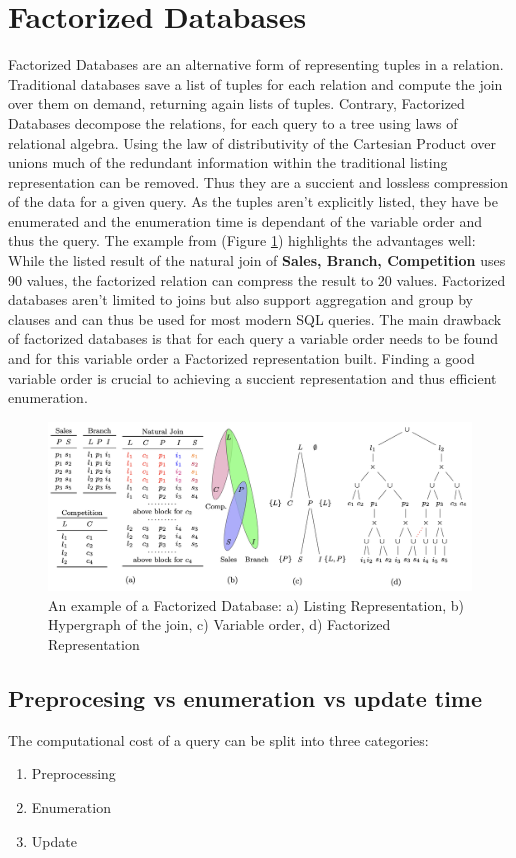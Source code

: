 \documentclass[abstracton,12pt]{scrreprt}
\begin{document}
\section{Factorized Databases}
Factorized Databases are an alternative form of representing tuples in a relation. Traditional databases save a list of tuples for each relation and compute the join over them on demand, returning again lists of tuples. Contrary, Factorized Databases decompose the relations, for each query to a tree using laws of relational algebra. Using the law of distributivity of the Cartesian Product over unions much of the redundant information within the traditional listing representation can be removed. Thus they are a succient and lossless compression of the data for a given query. As the tuples aren't explicitly listed, they have be enumerated and the enumeration time is dependant of the variable order and thus the query. 
The example from \cite{FactorizedDB} (Figure \ref{fig:factorizedDBExample}) highlights the advantages well: While the listed result of the natural join of \textbf{Sales, Branch, Competition} uses 90 values, the factorized relation can compress the result to 20 values. Factorized databases aren't limited to joins but also support aggregation and group by clauses and can thus be used for most modern SQL queries.
The main drawback of factorized databases is that for each query a variable order needs to be found and for this variable order a Factorized representation built. Finding a good variable order is crucial to achieving a succient representation and thus efficient enumeration. \cite{FactorizedDB}
\begin{figure}
	\includegraphics[width=\linewidth]{FactorizedExample.png}
	\caption{An example of a Factorized Database: a) Listing Representation, b) Hypergraph of the join, c) Variable order, d) Factorized Representation \cite{FactorizedDB}}
	\label{fig:factorizedDBExample}
\end{figure}


\subsection{Preprocesing vs enumeration vs update time}
The computational cost of a query can be split into three categories:
\begin{enumerate}
	\item  Preprocessing
	\item Enumeration
	\item Update
\end{enumerate}
\end{document}
